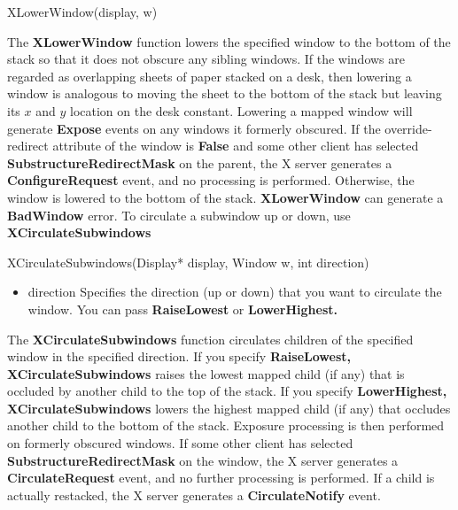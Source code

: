 \documentclass{report}
\begin{document}
\begin{itemize}
            \bigbreak \noindent 
            \begin{cppcode}
                XLowerWindow(display, w)
            \end{cppcode}
            \bigbreak \noindent 
            The \textbf{XLowerWindow} function lowers the specified window to the bottom of the stack so that it does not obscure any sibling windows. If the windows are regarded as overlapping sheets of paper stacked on a desk, then lowering a window is analogous to moving the sheet to the bottom of the stack but leaving its $x$ and $y$ location on the desk constant. Lowering a mapped window will generate \textbf{Expose} events on any windows it formerly obscured.
            \bigbreak \noindent 
            If the override-redirect attribute of the window is \textbf{False} and some other client has selected \textbf{SubstructureRedirectMask} on the parent, the X server generates a \textbf{ConfigureRequest} event, and no processing is performed. Otherwise, the window is lowered to the bottom of the stack.
            \bigbreak \noindent 
            \textbf{XLowerWindow} can generate a \textbf{BadWindow} error.
            \bigbreak \noindent 
            To circulate a subwindow up or down, use \textbf{XCirculateSubwindows}
            \bigbreak \noindent 
            \begin{cppcode}
                XCirculateSubwindows(Display* display, Window w, int direction)
            \end{cppcode}
            \begin{itemize}
                \item direction Specifies the direction (up or down) that you want to circulate the window. You can pass \textbf{RaiseLowest} or \textbf{LowerHighest.}
            \end{itemize}
            The \textbf{XCirculateSubwindows} function circulates children of the specified window in the specified direction. If you specify \textbf{RaiseLowest,} \textbf{XCirculateSubwindows} raises the lowest mapped child (if any) that is occluded by another child to the top of the stack. If you specify \textbf{LowerHighest,} \textbf{XCirculateSubwindows} lowers the highest mapped child (if any) that occludes another child to the bottom of the stack. Exposure processing is then performed on formerly obscured windows. If some other client has selected \textbf{SubstructureRedirectMask} on the window, the X server generates a \textbf{CirculateRequest} event, and no further processing is performed. If a child is actually restacked, the X server generates a \textbf{CirculateNotify} event.

\end{itemize}
\end{document}
